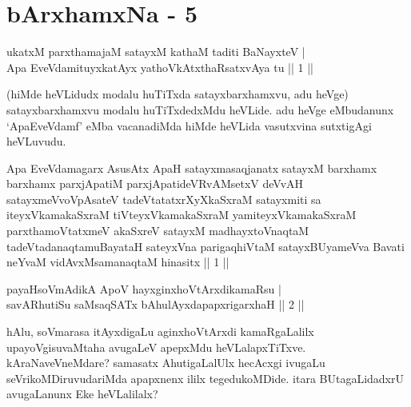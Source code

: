 \chapter{bArxhamxNa - 5}


\begin{shl}
ukatxM parxthamajaM satayxM kathaM taditi BaNayxteV | \\
Apa EveVdamituyxkatAyx yathoVkAtxthaRsatxvAya tu \hfill ||  1 || 
\end{shl}

\begin{artha}
(hiMde heVLidudx modalu huTiTxda satayxbarxhamxvu, adu heVge) satayxbarxhamxvu modalu huTiTxdedxMdu heVLide. adu heVge eMbudanunx `ApaEveVdamf' eMba vacanadiMda hiMde heVLida vasutxvina sutxtigAgi heVLuvudu.
\end{artha}


\begin{kandikeshl}
Apa EveVdamagarx AsusAtx ApaH satayxmasaqjanatx satayxM barxhamx barxhamx parxjApatiM parxjApatideVRvAMsetxV deVvAH satayxmeVvoVpAsateV tadeVtatatxrXyXkaSxraM satayxmiti sa iteyxVkamakaSxraM tiVteyxVkamakaSxraM yamiteyxVkamakaSxraM parxthamoVtatxmeV akaSxreV satayxM madhayxtoV\s naqtaM tadeVtadanaqtamuBayataH sateyxVna parigaqhiVtaM satayxBUyameVva Bavati neYvaM vidAvxMsamanaqtaM hinasitx || 1 ||
\end{kandikeshl}


\begin{shl}
payaHsoVmAdikA ApoV hayxginxhoVtArxdikamaRsu | \\
savARhutiSu saMsaqSATx bAhulAyxdapapxrigarxhaH \hfill ||  2 || 
\end{shl}

\begin{artha}
hAlu, soVmarasa itAyxdigaLu aginxhoVtArxdi kamaRgaLalilx upayoVgisuvaMtaha avugaLeV apepxMdu heVLalapxTiTxve. kAraNa\-\break veVneMdare? samasatx AhutigaLalUlx hecAcxgi ivugaLu seVrikoMDiruvudariMda apapxnenx ililx tegedukoMDide. itara BUtagaLidadxrU avugaLanunx Eke heVLalilalx?
\end{artha}

